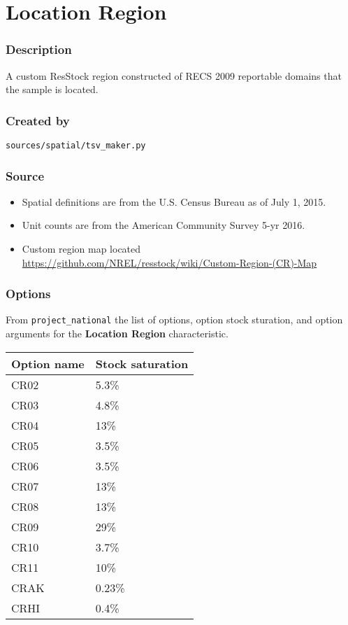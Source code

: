\section{Location Region}\label{location_region}

\subsubsection{Description}\label{description-107}

A custom ResStock region constructed of RECS 2009 reportable domains
that the sample is located.

\subsubsection{Created by}\label{created-by-108}

\texttt{sources/spatial/tsv\_maker.py}

\subsubsection{Source}\label{source-110}

\begin{itemize}
 
\item
  Spatial definitions are from the U.S. Census Bureau as of July 1,
  2015.
\item
  Unit counts are from the American Community Survey 5-yr 2016.
\item
  Custom region map located
  \url{https://github.com/NREL/resstock/wiki/Custom-Region-(CR)-Map}
\end{itemize}

\subsubsection{Options}\label{options-111}

From \texttt{project\_national} the list of options, option stock
sturation, and option arguments for the \textbf{Location Region}
characteristic.

\begin{longtable}[]{@{}ll@{}}
\toprule\noalign{}
Option name & Stock saturation \\
\midrule\noalign{}
\endhead
\bottomrule\noalign{}
\endlastfoot
CR02 & 5.3\% \\
CR03 & 4.8\% \\
CR04 & 13\% \\
CR05 & 3.5\% \\
CR06 & 3.5\% \\
CR07 & 13\% \\
CR08 & 13\% \\
CR09 & 29\% \\
CR10 & 3.7\% \\
CR11 & 10\% \\
CRAK & 0.23\% \\
CRHI & 0.4\% \\
\end{longtable}

